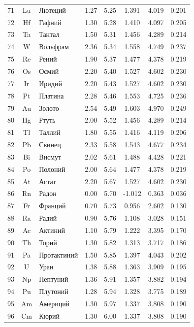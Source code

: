 \documentclass[12pt,a4paper]{article}
\theoremstyle{remark}
\begin{document}
\begin{longtable}{|c|c|p{2.5cm}|c|c|c|c|c|}
		71 & Lu & Лютеций & 1.27 & 5.25 & 1.391 & 4.019 & 0.201 \\
		72 & Hf & Гафний & 1.30 & 5.28 & 1.410 & 4.097 & 0.205 \\
		73 & Ta & Тантал & 1.50 & 5.31 & 1.456 & 4.289 & 0.214 \\
		74 & W & Вольфрам & 2.36 & 5.34 & 1.558 & 4.749 & 0.237 \\
		75 & Re & Рений & 1.90 & 5.37 & 1.477 & 4.378 & 0.219 \\
		76 & Os & Осмий & 2.20 & 5.40 & 1.527 & 4.602 & 0.230 \\
		77 & Ir & Иридий & 2.20 & 5.43 & 1.527 & 4.602 & 0.230 \\
		78 & Pt & Платина & 2.28 & 5.46 & 1.553 & 4.725 & 0.236 \\
		79 & Au & Золото & 2.54 & 5.49 & 1.603 & 4.970 & 0.249 \\
		80 & Hg & Ртуть & 2.00 & 5.52 & 1.456 & 4.289 & 0.214 \\
		81 & Tl & Таллий & 1.80 & 5.55 & 1.416 & 4.119 & 0.206 \\
		82 & Pb & Свинец & 2.33 & 5.58 & 1.543 & 4.677 & 0.234 \\
		83 & Bi & Висмут & 2.02 & 5.61 & 1.488 & 4.428 & 0.221 \\
		84 & Po & Полоний & 2.00 & 5.64 & 1.477 & 4.378 & 0.219 \\
		85 & At & Астат & 2.20 & 5.67 & 1.527 & 4.602 & 0.230 \\
		86 & Rn & Радон & 0.00 & 5.70 & -1.012 & 0.363 & 0.036 \\
		87 & Fr & Франций & 0.70 & 5.73 & 0.956 & 2.602 & 0.130 \\
		88 & Ra & Радий & 0.90 & 5.76 & 1.108 & 3.028 & 0.151 \\
		89 & Ac & Актиний & 1.10 & 5.79 & 1.222 & 3.395 & 0.170 \\
		90 & Th & Торий & 1.30 & 5.82 & 1.313 & 3.717 & 0.186 \\
		91 & Pa & Протактиний & 1.50 & 5.85 & 1.397 & 4.043 & 0.202 \\
		92 & U & Уран & 1.38 & 5.88 & 1.363 & 3.909 & 0.195 \\
		93 & Np & Нептуний & 1.36 & 5.91 & 1.357 & 3.882 & 0.194 \\
		94 & Pu & Плутоний & 1.28 & 5.94 & 1.328 & 3.775 & 0.189 \\
		95 & Am & Америций & 1.30 & 5.97 & 1.337 & 3.808 & 0.190 \\
		96 & Cm & Кюрий & 1.30 & 6.00 & 1.337 & 3.808 & 0.190 \\

\end{longtable}
\end{document}
